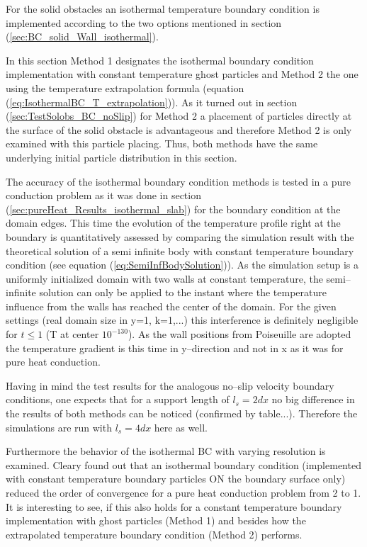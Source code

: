 \documentclass[11pt,a4paper,twoside]{report}
\begin{document}
For the solid obstacles an isothermal temperature boundary condition is implemented according to the two options mentioned in section (\ref{sec:BC_solid_Wall_isothermal}).

In this section Method 1 designates the isothermal boundary condition implementation with constant temperature ghost particles and Method 2 the one using the temperature extrapolation formula (equation (\ref{eq:IsothermalBC_T_extrapolation})).
As it turned out in section (\ref{sec:TestSolobs_BC_noSlip}) for Method 2 a placement of particles directly at the surface of the solid obstacle is advantageous and therefore Method 2 is only examined with this particle placing. Thus, both methods have the same underlying initial particle distribution in this section. 

The accuracy of the isothermal boundary condition methods is tested in a pure conduction problem as it was done in section (\ref{sec:pureHeat_Results_isothermal_slab}) for the boundary condition at the domain edges. This time the evolution of the temperature profile right at the boundary is quantitatively assessed by comparing the simulation result with the theoretical solution of a semi infinite body with constant temperature boundary condition (see equation (\ref{eq:SemiInfBodySolution})).
As the simulation setup is a uniformly initialized domain with two walls at constant temperature, the semi--infinite solution can only be applied to the instant where the temperature influence from the walls has reached the center of the domain. For the given settings (real domain size in y=1, k=1,...) this interference is definitely negligible for $t\leq 1$ (T at center $10^{-130}$). As the wall positions from Poiseuille are adopted the temperature gradient is this time in y--direction and not in x as it was for pure heat conduction.

Having in mind the test results for the analogous no--slip velocity boundary conditions, one expects that for a support length of $l_s=2dx$ no big difference in the results of both methods can be noticed (confirmed by table...). Therefore the simulations are run with $l_s=4dx$ here as well. 

Furthermore the behavior of the isothermal BC with varying resolution is examined. Cleary \cite{Cleary1999} found out that an isothermal boundary condition (implemented with constant temperature boundary particles ON the boundary surface only) reduced the order of convergence for a pure heat conduction problem from 2 to 1. It is interesting to see, if this also holds for a constant temperature boundary implementation with ghost particles (Method 1) and besides how the extrapolated temperature boundary condition (Method 2) performs.
\end{document}
